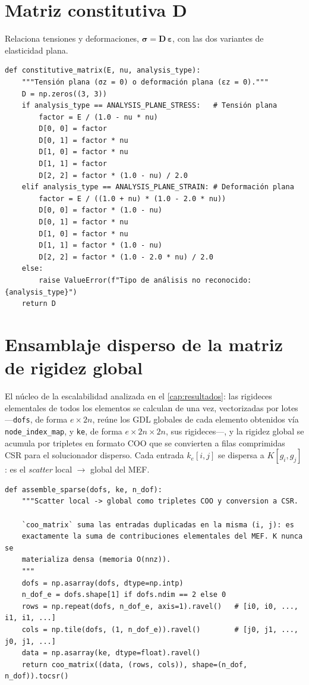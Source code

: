 \section{Matriz constitutiva D}

Relaciona tensiones y deformaciones, $\bm{\sigma} = \bm{D}\,\bm{\varepsilon}$, con las dos variantes de elasticidad plana.

\begin{lstlisting}
def constitutive_matrix(E, nu, analysis_type):
    """Tensión plana (σz = 0) o deformación plana (εz = 0)."""
    D = np.zeros((3, 3))
    if analysis_type == ANALYSIS_PLANE_STRESS:   # Tensión plana
        factor = E / (1.0 - nu * nu)
        D[0, 0] = factor
        D[0, 1] = factor * nu
        D[1, 0] = factor * nu
        D[1, 1] = factor
        D[2, 2] = factor * (1.0 - nu) / 2.0
    elif analysis_type == ANALYSIS_PLANE_STRAIN: # Deformación plana
        factor = E / ((1.0 + nu) * (1.0 - 2.0 * nu))
        D[0, 0] = factor * (1.0 - nu)
        D[0, 1] = factor * nu
        D[1, 0] = factor * nu
        D[1, 1] = factor * (1.0 - nu)
        D[2, 2] = factor * (1.0 - 2.0 * nu) / 2.0
    else:
        raise ValueError(f"Tipo de análisis no reconocido: {analysis_type}")
    return D
\end{lstlisting}

\section{Ensamblaje disperso de la matriz de rigidez global}

El núcleo de la escalabilidad analizada en el \autoref{cap:resultados}: las rigideces elementales de todos los elementos se calculan de una vez, vectorizadas por lotes —\texttt{dofs}, de forma $e\times 2n$, reúne los GDL globales de cada elemento obtenidos vía \texttt{node\_index\_map}, y \texttt{ke}, de forma $e\times 2n\times 2n$, sus rigideces—, y la rigidez global se acumula por tripletes en formato COO que se convierten a filas comprimidas CSR para el solucionador disperso. Cada entrada $k_e[i,j]$ se dispersa a $K[g_i, g_j]$: es el \emph{scatter} local $\to$ global del MEF.

\begin{lstlisting}
def assemble_sparse(dofs, ke, n_dof):
    """Scatter local -> global como tripletes COO y conversion a CSR.

    `coo_matrix` suma las entradas duplicadas en la misma (i, j): es
    exactamente la suma de contribuciones elementales del MEF. K nunca se
    materializa densa (memoria O(nnz)).
    """
    dofs = np.asarray(dofs, dtype=np.intp)
    n_dof_e = dofs.shape[1] if dofs.ndim == 2 else 0
    rows = np.repeat(dofs, n_dof_e, axis=1).ravel()   # [i0, i0, ..., i1, i1, ...]
    cols = np.tile(dofs, (1, n_dof_e)).ravel()        # [j0, j1, ..., j0, j1, ...]
    data = np.asarray(ke, dtype=float).ravel()
    return coo_matrix((data, (rows, cols)), shape=(n_dof, n_dof)).tocsr()
\end{lstlisting}


